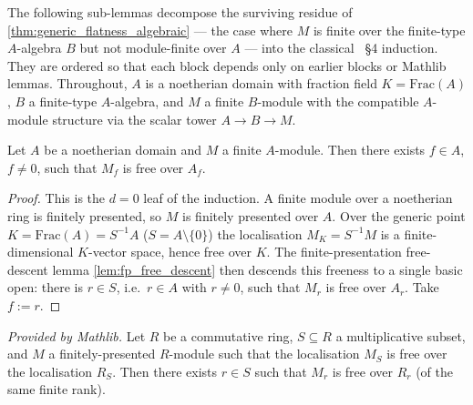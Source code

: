 The following sub-lemmas decompose the surviving residue of
\cref{thm:generic_flatness_algebraic} — the case where \(M\) is finite over the
finite-type \(A\)-algebra \(B\) but not module-finite over \(A\) — into the
classical \cite{nitsure-hilbert-quot}~\S4 induction. They are ordered so that each block
depends only on earlier blocks or Mathlib lemmas. Throughout,
\(A\) is a noetherian domain with fraction field \(K = \mathrm{Frac}(A)\), \(B\) a
finite-type \(A\)-algebra, and \(M\) a finite \(B\)-module with the compatible
\(A\)-module structure via the scalar tower \(A \to B \to M\).

\begin{lemma}
  \label{lem:gf_finite_module}
  Let \(A\) be a noetherian domain and \(M\) a finite \(A\)-module. Then there
  exists \(f \in A\), \(f \ne 0\), such that \(M_f\) is free over \(A_f\).
\end{lemma}

\begin{proof}


\leanok
  This is the \(d = 0\) leaf of the induction. A finite module over a noetherian ring is
  finitely presented, so
  \(M\) is finitely presented over \(A\). Over the generic point
  \(K = \mathrm{Frac}(A) = S^{-1}A\) (\(S = A \setminus \{0\}\)) the localisation
  \(M_K = S^{-1}M\) is a finite-dimensional \(K\)-vector space, hence free over
  \(K\). The finite-presentation free-descent lemma \cref{lem:fp_free_descent}
  then descends this freeness to a single basic open: there is \(r \in S\), i.e.\
  \(r \in A\) with \(r \ne 0\), such that \(M_r\) is free over \(A_r\). Take
  \(f := r\).
\end{proof}

\begin{lemma}
  \label{lem:fp_free_descent}
  \mathlibok
  \textit{Provided by Mathlib.}
  Let \(R\) be a commutative ring, \(S \subseteq R\) a multiplicative subset, and
  \(M\) a finitely-presented \(R\)-module such that the localisation \(M_S\) is
  free over the localisation \(R_S\). Then there exists \(r \in S\) such that
  \(M_r\) is free over \(R_r\) (of the same finite rank).
\end{lemma}

